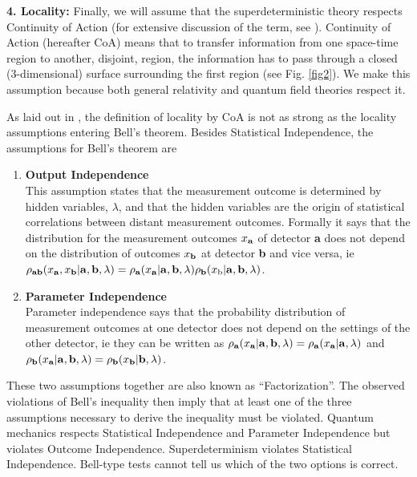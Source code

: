 \documentclass[12pt]{article}
\begin{document}
{\bf 4. Locality:} Finally, we will assume that the superdeterministic theory respects Continuity of Action (for extensive discussion of the term, see \cite{Wharton}). Continuity of Action (hereafter  CoA) means that to transfer information from one space-time region to another, disjoint, region, the information has to pass through a closed (3-dimensional) surface surrounding the first region (see Fig. \ref{fig2}). We make this assumption because both general relativity and quantum field theories respect it. 

As laid out in \cite{Wharton}, the definition of locality by CoA is not as strong as the locality assumptions entering Bell's theorem. Besides Statistical Independence, the assumptions for Bell's theorem are 
\begin{enumerate}
\item {\bf Output Independence}\\
This assumption states that the measurement outcome is determined by hidden variables, $\lambda$, and that the hidden variables are the origin of statistical correlations between distant measurement outcomes.  Formally it says that  the distribution for the measurement outcomes $x_{\bf a}$ of detector {\bf a} does not depend on the distribution of outcomes $x_{\bf b}$ at detector {\bf b} and vice versa, ie $\rho_{\bf ab} (x_{\bf a}, x_{\bf b}| {\bf a},{\bf b},\lambda) = \rho_{\bf a} (x_{\bf a}| {\bf a}, {\bf b}, \lambda) 
\rho_{\bf b} (x_{\rm b} | {\bf a}, {\bf b},\lambda)$.

\item {\bf Parameter Independence}\\
Parameter independence  says that the probability distribution of measurement outcomes at one detector does not depend on the settings of the other detector, ie they can be written as $\rho_{\bf a} (x_{\bf a}| {\bf a}, {\bf b}, \lambda) = \rho_{\bf a} (x_{\bf a}| {\bf a}, \lambda)$ and $\rho_{\bf b} (x_{\bf a}| {\bf a}, {\bf b}, \lambda) = \rho_{\bf b} (x_{\bf b}| {\bf b}, \lambda)$. 
\end{enumerate}
These two assumptions together are also known as ``Factorization''. The observed violations of Bell's inequality then imply that at least one of the three assumptions necessary to derive the inequality must be violated. Quantum mechanics respects Statistical Independence and Parameter Independence but violates Outcome Independence. Superdeterminism violates Statistical Independence. Bell-type tests cannot tell us which of the two options is correct. 
\end{document}
